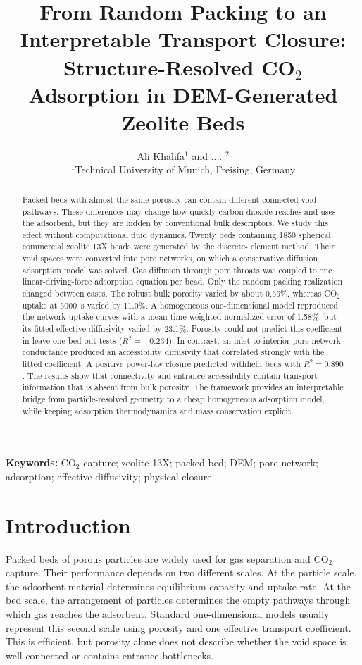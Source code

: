 \documentclass[11pt,a4paper]{article}
\title{From Random Packing to an Interpretable Transport Closure:\\
Structure-Resolved CO$_2$ Adsorption in DEM-Generated Zeolite Beds}
\author{Ali Khalifa$^{1}$ and .... $^{2}$\\[0.4em]
\small $^{1}$Technical University of Munich, Freising, Germany}
\date{}
\begin{document}
\maketitle

\begin{abstract}
Packed beds with almost the same porosity can contain different connected void
pathways. These differences may change how quickly carbon dioxide reaches and
uses the adsorbent, but they are hidden by conventional bulk descriptors. We
study this effect without computational fluid dynamics. Twenty beds containing
1850 spherical commercial zeolite 13X beads were generated by the discrete-
element method. Their void spaces were converted into pore networks, on which a
conservative diffusion--adsorption model was solved. Gas diffusion through pore
throats was coupled to one linear-driving-force adsorption equation per bead.
Only the random packing realization changed between cases. The robust bulk
porosity varied by about 0.55\%, whereas CO$_2$ uptake at 5000~s varied by
11.0\%. A homogeneous one-dimensional model reproduced the network uptake
curves with a mean time-weighted normalized error of 1.58\%, but its fitted
effective diffusivity varied by 23.1\%. Porosity could not predict this
coefficient in leave-one-bed-out tests ($R^2=-0.234$). In contrast, an
inlet-to-interior pore-network conductance produced an accessibility
diffusivity that correlated strongly with the fitted coefficient. A positive
power-law closure predicted withheld beds with $R^2=0.890$. The results show
that connectivity and entrance accessibility contain transport information
that is absent from bulk porosity. The framework provides an interpretable
bridge from particle-resolved geometry to a cheap homogeneous adsorption
model, while keeping adsorption thermodynamics and mass conservation explicit.
\end{abstract}

\noindent\textbf{Keywords:} CO$_2$ capture; zeolite 13X; packed bed; DEM;
pore network; adsorption; effective diffusivity; physical closure

\section{Introduction}

Packed beds of porous particles are widely used for gas separation and CO$_2$
capture. Their performance depends on two different scales. At the particle
scale, the adsorbent material determines equilibrium capacity and uptake rate.
At the bed scale, the arrangement of particles determines the empty pathways
through which gas reaches the adsorbent. Standard one-dimensional models
usually represent this second scale using porosity and one effective transport
coefficient. This is efficient, but porosity alone does not describe whether
the void space is well connected or contains entrance bottlenecks.
\end{document}
